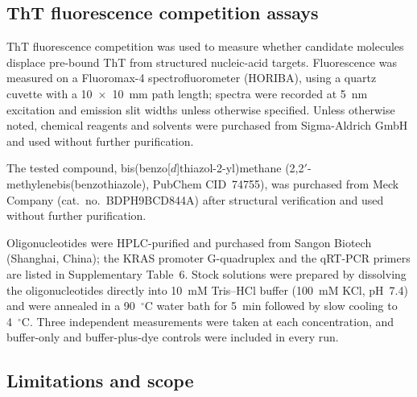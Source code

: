 \documentclass[pdflatex,sn-mathphys-num]{sn-jnl}
\theoremstyle{thmstyleone}
\theoremstyle{thmstyletwo}
\theoremstyle{thmstylethree}
\begin{document}
\subsection{ThT fluorescence competition assays}

ThT fluorescence competition was used to measure whether candidate molecules displace pre-bound ThT from structured nucleic-acid targets. Fluorescence was measured on a Fluoromax-4 spectrofluorometer (HORIBA), using a quartz cuvette with a 10~$\times$~10~mm path length; spectra were recorded at 5~nm excitation and emission slit widths unless otherwise specified. Unless otherwise noted, chemical reagents and solvents were purchased from Sigma-Aldrich GmbH and used without further purification.

The tested compound, bis(benzo[$d$]thiazol-2-yl)methane (2,2$'$-methylenebis(benzothiazole), PubChem CID~74755), was purchased from Meck Company (cat.\ no.\ BDPH9BCD844A) after structural verification and used without further purification.

Oligonucleotides were HPLC-purified and purchased from Sangon Biotech (Shanghai, China); the KRAS promoter G-quadruplex and the qRT-PCR primers are listed in Supplementary Table~6. Stock solutions were prepared by dissolving the oligonucleotides directly into 10~mM Tris--HCl buffer (100~mM KCl, pH~7.4) and were annealed in a 90~$^\circ$C water bath for 5~min followed by slow cooling to 4~$^\circ$C. Three independent measurements were taken at each concentration, and buffer-only and buffer-plus-dye controls were included in every run.

\subsection{Limitations and scope}
\end{document}
